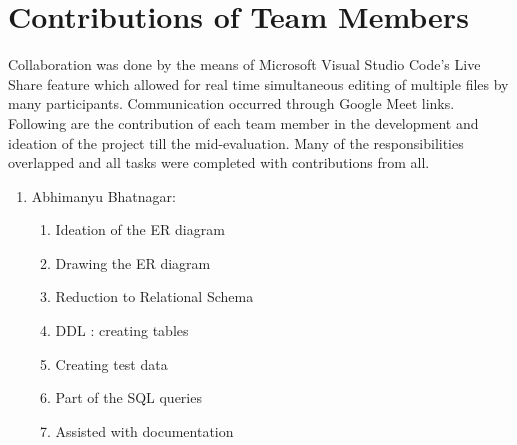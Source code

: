 \documentclass[12pt]{report}
\begin{document}
\chapter{Contributions of Team Members}
Collaboration was done by the means of Microsoft Visual Studio Code's Live Share feature which allowed for real time simultaneous editing of multiple files by many participants. Communication occurred through Google Meet links. Following are the contribution of each team member in the development and ideation of the project till the mid-evaluation. Many of the responsibilities overlapped and all tasks were completed with contributions from all. 

	\begin{enumerate}
		\item Abhimanyu Bhatnagar:
			\begin{enumerate}
				\item Ideation of the ER diagram
				\item Drawing the ER diagram
				\item Reduction to Relational Schema
				\item DDL : creating tables
				\item Creating test data
				\item Part of the SQL queries
				\item Assisted with documentation
			\end{enumerate}
		

\end{enumerate}
\end{document}
